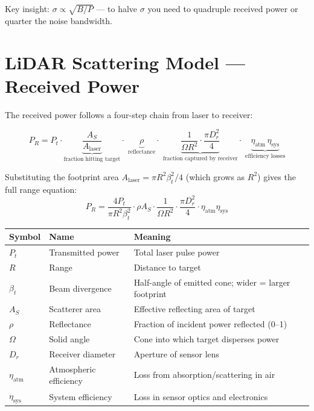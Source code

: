 \documentclass[12pt, a4paper]{article}
\begin{document}
Key insight: $\sigma \propto \sqrt{B/P}$ --- to halve $\sigma$ you need to
quadruple received power or quarter the noise bandwidth.

\section*{LiDAR Scattering Model --- Received Power}

The received power follows a four-step chain from laser to receiver:

\[
  P_R = P_t \cdot
        \underbrace{\frac{A_S}{A_{\text{laser}}}}_{\text{fraction hitting target}}
        \cdot\;
        \underbrace{\rho}_{\text{reflectance}}
        \cdot\;
        \underbrace{\frac{1}{\Omega R^2}\cdot\frac{\pi D_r^2}{4}}_{\text{fraction captured by receiver}}
        \cdot\;
        \underbrace{\eta_{\text{atm}}\,\eta_{\text{sys}}}_{\text{efficiency losses}}
\]

Substituting the footprint area $A_{\text{laser}} = \pi R^2 \beta_t^2/4$
(which grows as $R^2$) gives the full range equation:
\[
  P_R = \frac{4P_t}{\pi R^2 \beta_t^2}\cdot\rho A_S\cdot
        \frac{1}{\Omega R^2}\cdot\frac{\pi D_r^2}{4}\cdot\eta_{\text{atm}}\eta_{\text{sys}}
\]

\begin{center}
\renewcommand{\arraystretch}{1.4}
\begin{tabular}{p{1.2cm} p{3cm} p{8cm}}
  \toprule
  \textbf{Symbol} & \textbf{Name} & \textbf{Meaning} \\
  \midrule
  $P_t$             & Transmitted power    & Total laser pulse power \\
  $R$               & Range                & Distance to target \\
  $\beta_t$         & Beam divergence      & Half-angle of emitted cone; wider = larger footprint \\
  $A_S$             & Scatterer area       & Effective reflecting area of target \\
  $\rho$            & Reflectance          & Fraction of incident power reflected (0--1) \\
  $\Omega$          & Solid angle          & Cone into which target disperses power \\
  $D_r$             & Receiver diameter    & Aperture of sensor lens \\
  $\eta_{\text{atm}}$ & Atmospheric efficiency & Loss from absorption/scattering in air \\
  $\eta_{\text{sys}}$ & System efficiency    & Loss in sensor optics and electronics \\
  \bottomrule
\end{tabular}
\end{center}
\end{document}
